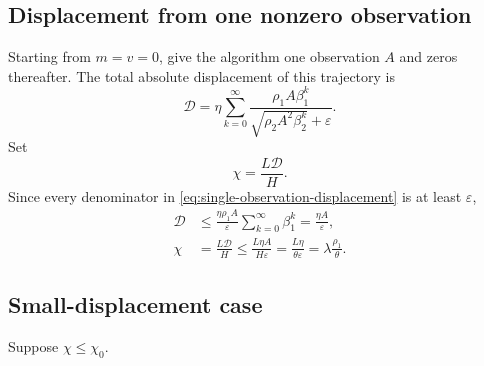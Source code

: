 \documentclass[11pt,letterpaper]{article}
\theoremstyle{definition}
\newcommand{\eps}{\varepsilon}
\begin{document}
\subsection{Displacement from one nonzero observation}

Starting from $m=v=0$, give the algorithm one observation $A$ and
zeros thereafter.  The total absolute displacement of this trajectory is
\begin{equation}
\mathcal D
=\eta\sum_{k=0}^\infty
\frac{\rho_1A\beta_1^k}
{\sqrt{\rho_2A^2\beta_2^k}+\eps}.
\label{eq:single-observation-displacement}
\end{equation}
Set
\begin{equation}
\chi=\frac{L\mathcal D}{H}.
\label{eq:scalar-displacement-ratio}
\end{equation}
Since every denominator in \eqref{eq:single-observation-displacement} is at
least $\eps$,
\begin{equation}
\begin{aligned}
\mathcal D&\le\frac{\eta\rho_1A}{\eps}
\sum_{k=0}^\infty\beta_1^k=\frac{\eta A}{\eps},\\
\chi&=\frac{L\mathcal D}{H}
\le\frac{L\eta A}{H\eps}
=\frac{L\eta}{\theta\eps}=\lambda\frac{\rho_1}{\theta}.
\end{aligned}
\label{eq:single-displacement-upper}
\end{equation}

\subsection{Small-displacement case}

Suppose $\chi\le\chi_0$.
\end{document}
